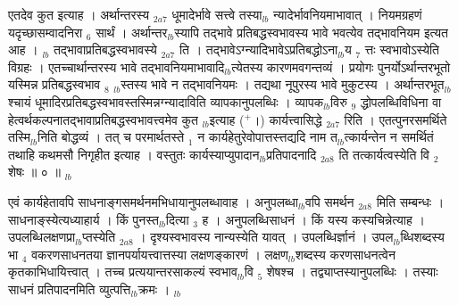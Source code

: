 \documentclass[article,12pt,a4paper]{memoir}%
\newcommand{\add}[1]{($^{+}$#1)}
\newcounter{parCount}
\begin{document}
	  
	  \pstart \leavevmode%
	\hphantom{.}एतदेव कुत इत्याह । {\color{DodgerBlue3}अर्थान्तरस्य} {\tiny $_{2a7}$} धूमादेर्भावे सत्त्वे तस्या{\tiny $_{lb}$} \leavevmode{} न्यादेर्भावनियमाभावात् । नियमग्रहणं यदृच्छासम्वादनिरा {\tiny $_{6}$} सार्थं । अर्थान्तर{\tiny $_{lb}$}स्यापि तद्भावे प्रतिबद्धस्वभावस्य भावे भवत्येव तद्भावनियम इत्यत आह । {\tiny $_{lb}$} {\color{DodgerBlue3}तद्भावाप्रतिबद्धस्वभावस्ये} {\tiny $_{2a7}$} ति । तद्भावेऽग्न्यादिभावेऽप्रतिबद्धोऽना{\tiny $_{lb}$}य {\tiny $_{7}$} त्तः स्वभावोऽस्येति विग्रहः । एतच्चार्थान्तरस्य भावे तद्भावनियमाभावादि{\tiny $_{lb}$}त्येतस्य कारणमवगन्तव्यं । प्रयोगः पुनर्योऽर्थान्तरभूतो यस्मिन्न प्रतिबद्धस्वभाव {\tiny $_{8}$} {\tiny $_{lb}$}स्तस्य भावे न तद्भावनियमः । तद्यथा नूपुरस्य भावे मुकुटस्य । अर्थान्तरभूत{\tiny $_{lb}$}श्चायं धूमादिरप्रतिबद्धस्वभावस्तस्मिन्नग्न्यादाविति व्यापकानुपलब्धिः । व्यापक{\tiny $_{lb}$}विरु {\tiny $_{9}$} \leavevmode{} द्धोपलब्धिविधिना वा हेत्वर्थकल्पनातद्भावाप्रतिबद्धस्वभावत्त्वमेव कुत {\tiny $_{lb}$}इत्याह \add{।} {\color{DodgerBlue3}कार्यत्त्वासिद्धे} {\tiny $_{2a7}$} रिति । एतत्पुनरसमर्थिते तस्मि{\tiny $_{lb}$}निति बोद्धव्यं । तत् च परमार्थतस्ते {\tiny $_{1}$} न कार्यहेतुरेवोपात्तस्त्तद्यदि नाम त{\tiny $_{lb}$}त्कार्यन्तेन न समर्थितं तथाहि कथमसौ निगृहीत इत्याह । {\color{DodgerBlue3}वस्तुतः कार्यस्याप्युपादान{\tiny $_{lb}$}प्रतिपादनादि} {\tiny $_{2a8}$} ति तत्कार्यत्वस्येति वि {\tiny $_{2}$} शेषः ॥ ० ॥
	{}
	\pend%
      {\tiny $_{lb}$}

	  
	  \pstart \leavevmode%
	\hphantom{.}एवं कार्यहेतावपि साधनाङ्गसमर्थनमभिधायानुपलब्धावाह । {\color{DodgerBlue3}अनुपलब्धा{\tiny $_{lb}$}वपि समर्थन} {\tiny $_{2a8}$} मिति सम्बन्धः । साधनाङ्स्येत्यध्याहार्य । किं पुनस्त{\tiny $_{lb}$}दित्या {\tiny $_{3}$} ह । अनुपलब्धिसाधनं । किं यस्य कस्यचिन्नेत्याह । {\color{DodgerBlue3}उपलब्धिलक्षणप्रा{\tiny $_{lb}$}प्तस्येति} {\tiny $_{2a8}$} । दृश्यस्वभावस्य नान्यस्येति यावत् । उपलब्धिर्ज्ञानं । उपल{\tiny $_{lb}$}ब्धिशब्दस्य भा {\tiny $_{4}$} वकरणसाधनतया ज्ञानपर्यायत्त्वात्तस्या लक्षणङ्कारणं । लक्षण{\tiny $_{lb}$}शब्दस्य करणसाधनत्वेन कृतकाभिधायित्त्वात् । तच्च प्रत्ययान्तरसाकल्यं स्वभाव{\tiny $_{lb}$}वि {\tiny $_{5}$} शेषश्च । तद्व्याप्तस्यानुपलब्धिः । तस्याः साधनं प्रतिपादनमिति व्युत्पत्ति{\tiny $_{lb}$}क्रमः ।
	{}
	\pend%
      {\tiny $_{lb}$}
\end{document}
